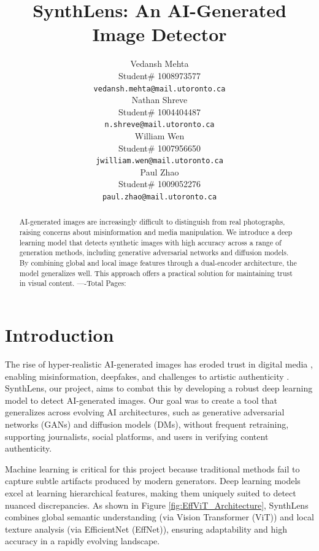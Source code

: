 \documentclass{article} %
\title{SynthLens: An AI-Generated Image Detector}
\author{Vedansh Mehta  \\
Student\# 1008973577 \\
\texttt{vedansh.mehta@mail.utoronto.ca} \\
\And
Nathan Shreve  \\
Student\# 1004404487 \\
\texttt{n.shreve@mail.utoronto.ca} \\
\AND
William Wen  \\
Student\# 1007956650 \\
\texttt{jwilliam.wen@mail.utoronto.ca} \\
\And
Paul Zhao \\
Student\# 1009052276 \\
\texttt{paul.zhao@mail.utoronto.ca} \\
\AND
}
\begin{document}
\maketitle

\begin{abstract}
    AI-generated images are increasingly difficult to distinguish from real photographs, raising concerns about misinformation and media manipulation. We introduce a deep learning model that detects synthetic images with high accuracy across a range of generation methods, including generative adversarial networks and diffusion models. By combining global and local image features through a dual-encoder architecture, the model generalizes well. This approach offers a practical solution for maintaining trust in visual content.
    ----Total Pages: \pageref{last_page}
\end{abstract}



\section{Introduction}
The rise of hyper-realistic AI-generated images has eroded trust in digital media \citep{digitalcontent2024trust}, enabling misinformation, deepfakes, and challenges to artistic authenticity \citep{Guardian2023}. SynthLens, our project, aims to combat this by developing a robust deep learning model to detect AI-generated images. Our goal was to create a tool that generalizes across evolving AI architectures, such as generative adversarial networks (GANs) and diffusion models (DMs), without frequent retraining, supporting journalists, social platforms, and users in verifying content authenticity.

Machine learning is critical for this project because traditional methods fail to capture subtle artifacts produced by modern generators. Deep learning models excel at learning hierarchical features, making them uniquely suited to detect nuanced discrepancies. As shown in Figure \ref{fig:EffViT_Architecture}, SynthLens combines global semantic understanding (via Vision Transformer (ViT)) and local texture analysis (via EfficientNet (EffNet)), ensuring adaptability and high accuracy in a rapidly evolving landscape.
\end{document}
